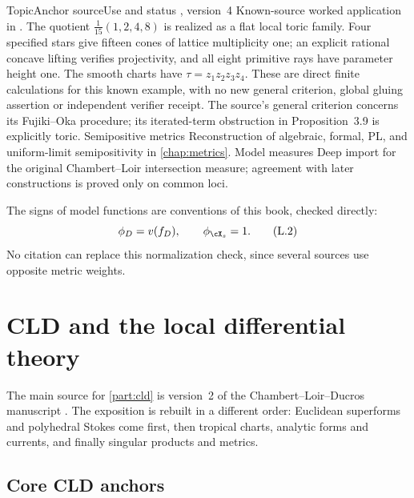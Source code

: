 \begin{AppLProvenanceLedger}{Topic}{Anchor source}{Use and status}
  {\cite[Example~3.10 and Theorem~3.1]{SS20FujikiV4}, version~4}
  {Known-source worked application in
   . The quotient
   $\tfrac1{15}(1,2,4,8)$ is realized as a flat local toric family.
   Four specified stars give fifteen cones of lattice multiplicity one;
   an explicit rational concave lifting verifies projectivity, and all
   eight primitive rays have parameter height one. The smooth charts
   have $\tau=z_1z_2z_3z_4$. These are direct finite calculations for
   this known example, with no new general criterion, global gluing
   assertion or independent verifier receipt. The source's general
   criterion concerns its Fujiki--Oka procedure; its iterated-term
   obstruction in Proposition~3.9 is explicitly toric.}
\AppLProvenanceRecord
  {Semipositive metrics}
  {\cite{Zhang1995,GM19}}
  {Reconstruction of algebraic, formal, PL, and uniform-limit
   semipositivity in \cref{chap:metrics}.}
\AppLProvenanceRecord
  {Model measures}
  {\cite{CL06}}
  {Deep import for the original Chambert--Loir intersection measure;
   agreement with later constructions is proved only on common loci.}
\end{AppLProvenanceLedger}

The signs of model functions are conventions of this book, checked directly:
\[
                       \phi_D=v(f_D),
               \qquad \phi_{\cX_s}=1.
\tag{L.2}\label{eq:appL-model-sign}
\]
No citation can replace this normalization check, since several sources use
opposite metric weights.

\section{CLD and the local differential theory}
\label{sec:appL-cld}

The main source for \cref{part:cld} is version~2 of the
Chambert--Loir--Ducros manuscript \cite{CLD25}.  The exposition is rebuilt in
a different order: Euclidean superforms and polyhedral Stokes come first,
then tropical charts, analytic forms and currents, and finally singular
products and metrics.

\subsection{Core CLD anchors}
\label{sec:appL-core-cld}

